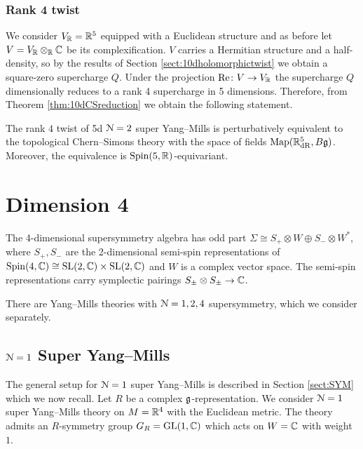 \documentclass[10pt, oneside]{article}
\renewcommand{\Re}{\mathrm{Re}}
\begin{document}
\subsubsection{Rank 4 twist}
\label{sect:5drank4twist}

We consider $V_\mathbb R=\mathbb R^5$ equipped with a Euclidean structure and as before let $V=V_\mathbb R\otimes_\mathbb R\mathbb C$ be its complexification. $V$ carries a Hermitian structure and a half-density, so by the results of Section \ref{sect:10dholomorphictwist} we obtain a square-zero supercharge $Q$. Under the projection $\Re\colon V\rightarrow V_\RR$ the supercharge $Q$ dimensionally reduces to a rank 4 supercharge in 5 dimensions. Therefore, from Theorem \ref{thm:10dCSreduction} we obtain the following statement.

\begin{theorem}
The rank $4$ twist of 5d $\mathcal N=2$ super Yang--Mills is perturbatively equivalent to the topological Chern--Simons theory with the space of fields $\operatorname{Map}(\mathbb R^5_{\mathrm{dR}}, B\mathfrak g)$. Moreover, the equivalence is $\mathrm{Spin}(5, \mathbb R)$-equivariant.
\end{theorem}
 
\section{Dimension 4}

The 4-dimensional supersymmetry algebra has odd part $\Sigma\cong S_+\otimes W\oplus S_-\otimes W^*$, where $S_+, S_-$ are the 2-dimensional semi-spin representations of $\mathrm{Spin}(4, \mathbb C)\cong \mathrm{SL}(2, \mathbb C) \times \mathrm{SL}(2, \mathbb C)$ and $W$ is a complex vector space. The semi-spin representations carry symplectic pairings $S_\pm\otimes S_\pm\rightarrow \mathbb C$.

There are Yang--Mills theories with $\mathcal N=1,2,4$ supersymmetry, which we consider separately.

\subsection{\texorpdfstring{$\mathcal N=1$}{N=1} Super Yang--Mills} \label{sect:4d_1_section}
The general setup for $\mathcal N=1$ super Yang--Mills is described in Section \ref{sect:SYM} which we now recall.  Let $R$ be a complex $\mathfrak g$-representation. We consider $\mathcal N=1$ super Yang--Mills theory on $M=\mathbb R^4$ with the Euclidean metric. The theory admits an $R$-symmetry group $G_R=\mathrm{GL}(1, \mathbb C)$ which acts on $W=\mathbb C$ with weight $1$.

\vspace{-10pt}
\end{document}
